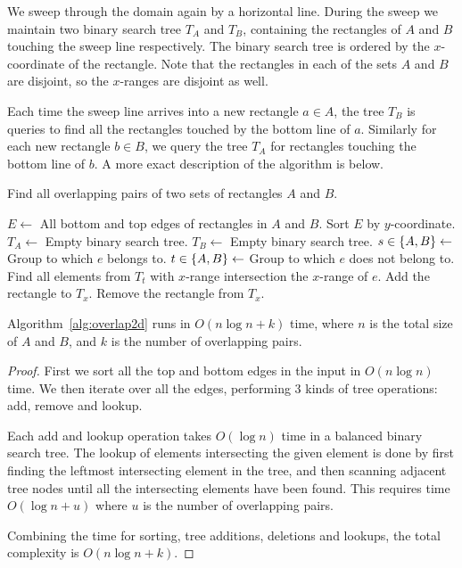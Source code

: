 \documentclass[english,gradu]{tktltiki2018}
\begin{document}
We sweep through the domain again by a horizontal line.
During the sweep we maintain two binary search tree $T_A$ and $T_B$, containing the rectangles of $A$ and $B$ touching the sweep line respectively.
The binary search tree is ordered by the $x$-coordinate of the rectangle.
Note that the rectangles in each of the sets $A$ and $B$ are disjoint, so the $x$-ranges are disjoint as well.

Each time the sweep line arrives into a new rectangle $a\in A$, the tree $T_B$ is queries to find all the rectangles touched by the bottom line of $a$.
Similarly for each new rectangle $b\in B$, we query the tree $T_A$ for rectangles touching the bottom line of $b$.
A more exact description of the algorithm is below.

\begin{alg}\label{alg:overlap2d}
Find all overlapping pairs of two sets of rectangles $A$ and $B$.
\begin{algorithmic}
\State $E\gets$ All bottom and top edges of rectangles in $A$ and $B$.
\State Sort $E$ by $y$-coordinate.
\State $T_A\gets$ Empty binary search tree.
\State $T_B\gets$ Empty binary search tree.
	\State $s\in\left\{A,B\right\}\gets$ Group to which $e$ belongs to.
	\State $t\in\left\{A,B\right\}\gets$ Group to which $e$ does not belong to.
		\State Find all elements from $T_t$ with $x$-range intersection the $x$-range of $e$.
		\State Add the rectangle to $T_x$.
	\Else
		\State Remove the rectangle from $T_x$.
	\EndIf
\EndFor
\end{algorithmic}
\end{alg}

\begin{lem}\label{lem:overlap2dtime}Algorithm~\ref{alg:overlap2d} runs in $O(n\log n + k)$ time, where $n$ is the total size of $A$ and $B$, and $k$ is the number of overlapping pairs.\end{lem}
\begin{proof}
First we sort all the top and bottom edges in the input in $O(n\log n)$ time.
We then iterate over all the edges, performing 3 kinds of tree operations: add, remove and lookup.

Each add and lookup operation takes $O(\log n)$ time in a balanced binary search tree.
The lookup of elements intersecting the given element is done by first finding the leftmost intersecting element in the tree, and then scanning adjacent tree nodes until all the intersecting elements have been found.
This requires time $O(\log n+u)$ where $u$ is the number of overlapping pairs.

Combining the time for sorting, tree additions, deletions and lookups, the total complexity is $O(n\log n + k)$.
\end{proof}
\end{document}
